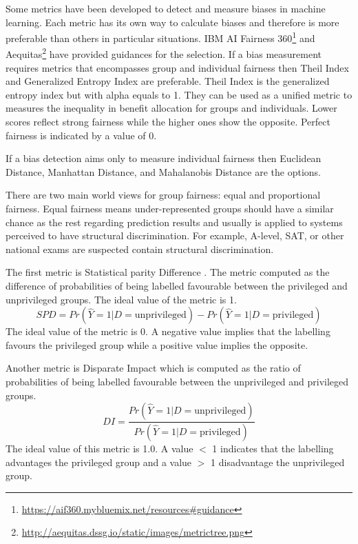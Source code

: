 \documentclass[sigconf,review]{acmart}
\begin{document}
Some metrics have been developed to detect and measure biases in machine learning. Each metric has its own way to calculate biases and therefore is more preferable than others in particular situations. IBM AI Fairness 360\footnote{\url{https://aif360.mybluemix.net/resources\#guidance}} \cite{mahoney2020ai} and Aequitas\footnote{\url{http://aequitas.dssg.io/static/images/metrictree.png}} have provided guidances for the selection. If a bias measurement requires metrics that encompasses group and individual fairness then Theil Index \cite{conceicao2000theyoung,bellamy2018ai} and Generalized Entropy Index \cite{speicher2018unified} are preferable. Theil Index is the generalized entropy index  but with alpha equals to 1. They can be used as a unified metric to measures the inequality in benefit allocation for groups and individuals. Lower scores reflect strong fairness while the higher ones show the opposite. Perfect fairness is indicated by a value of 0. 

If a bias detection aims only to measure individual fairness then Euclidean Distance, Manhattan Distance, and Mahalanobis Distance are the options.

There are two main world views for group fairness: equal and proportional fairness. Equal fairness means under-represented groups should have a similar chance as the rest regarding prediction results and usually is applied to systems perceived to have structural discrimination. For example, A-level, SAT, or other national exams are suspected contain structural discrimination.

The first metric is Statistical parity Difference \cite{dwork2012fairness,bellamy2018ai}. The metric computed as the difference of probabilities of being labelled favourable between the privileged and unprivileged groups. The ideal value of the metric is 1.
\begin{equation} \label{eq:1}
	SPD = Pr(\hat{Y} = 1 | D = \text{unprivileged})
	- Pr(\hat{Y} = 1 | D = \text{privileged})
\end{equation}
The ideal value of the metric is 0. A negative value implies that the labelling favours the privileged group while a positive value implies the opposite.

Another metric is Disparate Impact \cite{feldman2015disparate,bellamy2018ai} which is computed as the ratio of probabilities of being labelled favourable between the unprivileged and privileged groups.
\begin{equation}
	DI = \frac{Pr(\hat{Y} = 1 | D = \text{unprivileged})}
	{Pr(\hat{Y} = 1 | D = \text{privileged})}
\end{equation}
The ideal value of this metric is 1.0. A value $<$ 1 indicates that the labelling advantages the privileged group and a value $>$ 1 disadvantage the unprivileged group.
\end{document}
